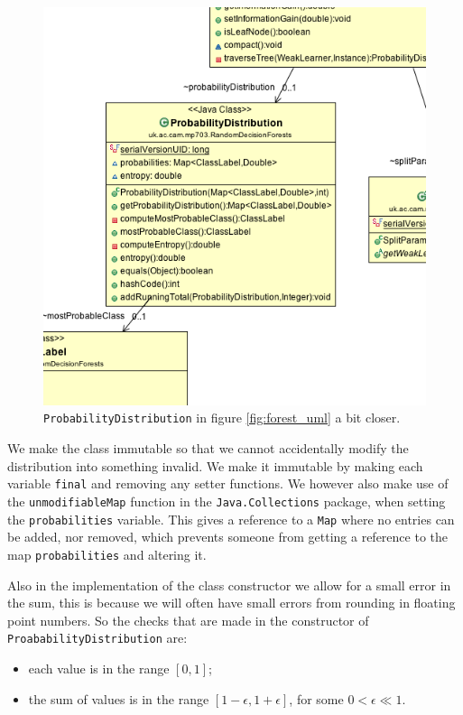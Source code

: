 \documentclass[12pt,twoside,notitlepage]{report}
\begin{document}
                \begin{figure}[H]
                    \centering
                    \includegraphics[scale=0.5]{ProbabilityDistribution_Forest_UML}
                    \caption{\texttt{ProbabilityDistribution} in figure \ref{fig:forest_uml} a bit closer.}
                    \label{fig:prob_dist_uml}
                \end{figure}

                We make the class immutable so that we cannot accidentally modify the distribution into something 
                invalid. We make it immutable by making each variable \texttt{final} and removing any setter functions. 
                We however also make use of the \texttt{unmodifiableMap} function in the \texttt{Java.Collections} 
                package, when setting the \texttt{probabilities} variable. This gives a reference to a \texttt{Map} 
                where no entries can be added, nor removed, which prevents someone from getting a reference to the map
                \texttt{probabilities} and altering it.

                Also in the implementation of the class constructor we allow for a small error in the sum, this is 
                because we will often have small errors from rounding in floating point numbers. So the checks that 
                are made in the constructor of \texttt{ProababilityDistribution} are:
                \begin{itemize}
                    \item 
                        each value is in the range $[0,1]$;
                    \item 
                        the sum of values is in the range $[1-\epsilon,1+\epsilon]$, for some $0 < \epsilon \ll 1$.
                \end{itemize}
\end{document}
